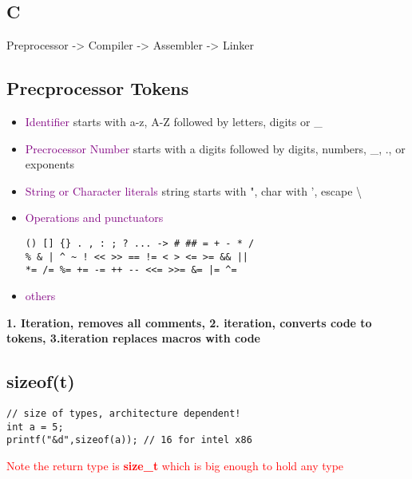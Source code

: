 \documentclass[main.tex,fontsize=7pt,paper=a4,paper=landscape,DIV=calc,]{scrartcl}
\begin{document}
\begin{multicols*}{4}
\lstset{
    language=c,
    style=code,
}
\section{C}
Preprocessor -> Compiler -> Assembler -> Linker

\subsection{Precprocessor Tokens}
\begin{itemize}
\item \textcolor{purple}{Identifier}\newline
starts with a-z, A-Z followed by letters, digits or \_
\item \textcolor{purple}{Precrocessor Number}\newline
  starts with a digits followed by digits, numbers, \_, ., or exponents
\item \textcolor{purple}{String or Character literals}\newline
  string starts with ", char with ', escape \textbackslash 
\item \textcolor{purple}{Operations and punctuators}\newline
\vspace{-2.5mm}
\begin{lstlisting}
() [] {} . , : ; ? ... -> # ## = + - * /
% & | ^ ~ ! << >> == != < > <= >= && ||
*= /= %= += -= ++ -- <<= >>= &= |= ^=
\end{lstlisting}
\vspace{2mm}
\item \textcolor{purple}{others}
\end{itemize} 

\textbf{1. Iteration, removes all comments, 2. iteration, converts code to tokens, 3.iteration replaces macros with code}

\subsection{sizeof(t)}
\vspace{-2.5mm}
\begin{lstlisting}
// size of types, architecture dependent!
int a = 5;
printf("&d",sizeof(a)); // 16 for intel x86
\end{lstlisting}
\vspace{2mm}
\textcolor{red}{Note the return type is \textbf{size\_t} which is big enough to hold any type}


\end{multicols*}
\end{document}
